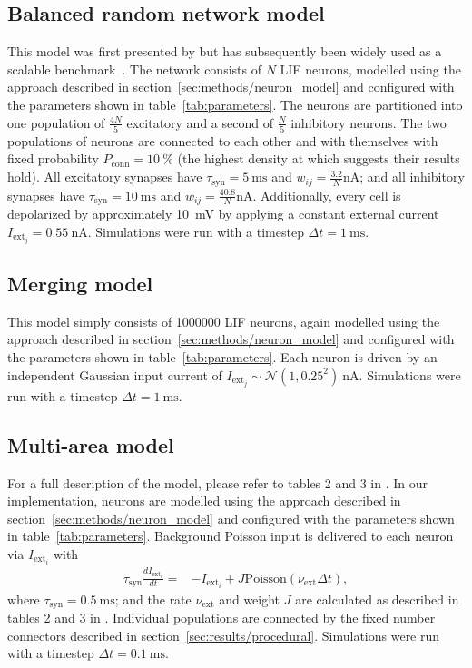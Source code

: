 \documentclass[9pt,a4paper]{amsart}
\begin{document}
\subsection{Balanced random network model}
\label{sec:methods/va_benchmark}
This model was first presented by \citet{Vogels2005} but has subsequently been widely used as a scalable benchmark~\citep{Brette2007}.
The network consists of $N$ LIF neurons, modelled using the approach described in section~\ref{sec:methods/neuron_model} and configured with the parameters shown in table~\ref{tab:parameters}.
The neurons are partitioned into one population of $\frac{4N}{5}$ excitatory and a second of $\frac{N}{5}$ inhibitory neurons.
The two populations of neurons are connected to each other and with themselves with fixed probability $P_{\text{conn}}=\SI{10}{\percent}$ (the highest density at which \citet{Vogels2005} suggests their results hold).
All excitatory synapses have $\tau_{\text{syn}}=\SI{5}{\milli\second}$ and $w_{ij}=\frac{3.2}{N}\si{\nano\ampere}$; and all inhibitory synapses have $\tau_{\text{syn}}=\SI{10}{\milli\second}$ and $w_{ij}=\frac{40.8}{N}\si{\nano\ampere}$.
Additionally, every cell is depolarized by approximately \SI{10}{\milli\volt} by applying a constant external current $I_{\text{ext}_j}= \SI{0.55}{\nano\ampere}$.
Simulations were run with a timestep $\Delta t = \SI{1}{\milli\second}$.

\subsection{Merging model}
\label{sec:methods/merging}
This model simply consists of \num{1000000} LIF neurons, again modelled using the approach described in section~\ref{sec:methods/neuron_model} and configured with the parameters shown in table~\ref{tab:parameters}. 
Each neuron is driven by an independent Gaussian input current of $I_{\text{ext}_j} \sim \mathcal{N}(1, 0.25^2)\SI{}{\nano\ampere}$.
Simulations were run with a timestep $\Delta t = \SI{1}{\milli\second}$.

\subsection{Multi-area model}
\label{sec:methods/multi_area_model}
For a full description of the model, please refer to tables 2 and 3 in \citet{Schmidt2018}.
In our implementation, neurons are modelled using the approach described in section~\ref{sec:methods/neuron_model} and configured with the parameters shown in table~\ref{tab:parameters}.
Background Poisson input is delivered to each neuron via $I_{\text{ext}_{i}}$ with
%
\begin{align}
    \tau_{\text{syn}} \frac{dI_{\text{ext}_{i}}}{dt} = & -I_{\text{ext}_{i}} + J \text{Poisson}(\nu_{\text{ext}} \Delta t),
\end{align}
%
where $\tau_{\text{syn}}=\SI{0.5}{\milli\second}$; and the rate $\nu_{\text{ext}}$ and weight $J$ are calculated as described in tables 2 and 3 in \citet{Schmidt2018}.
Individual populations are connected by the fixed number connectors described in section~\ref{sec:results/procedural}.
Simulations were run with a timestep $\Delta t = \SI{0.1}{\milli\second}$.
\end{document}
